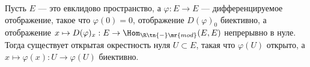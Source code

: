 \documentclass[
	extrafontsizes,
	11pt,
	hyphens,
]{memoir}
\begin{document}

\begin{theorem}
Пусть \(E\) --- это евклидово пространство,
а \(\varphi : E \to E\) --- дифференцируемое отображение, такое что \(\varphi(0) = 0\), отображение \(D(\varphi)_0\) биективно,
а отображение
\(x \mapsto D(\varphi)_x : E \to \Hom_{\R\tn{-}\mr{mod}}(E,E)\) непрерывно в нуле.
Тогда существует открытая окрестность нуля \(U \subset E\), такая что \(\varphi(U)\) открыто, а \(x \mapsto \varphi(x) : U \to \varphi(U)\) биективно.
\end{theorem}
\end{document}
